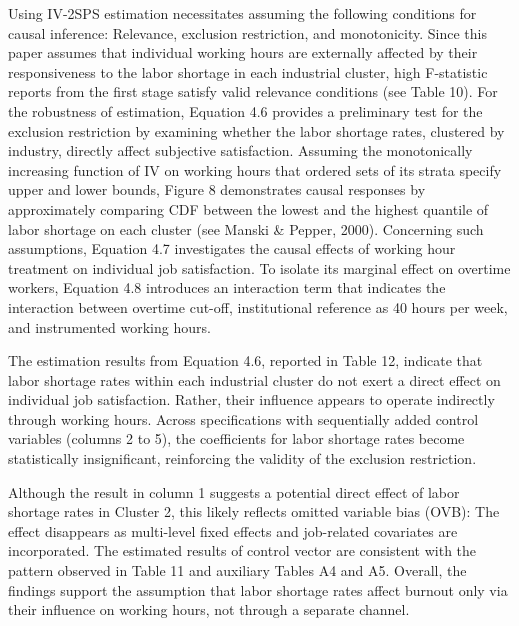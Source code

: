 \documentclass[
  12pt,
]{article}
\begin{document}
Using IV-2SPS estimation necessitates assuming the following conditions
for causal inference: Relevance, exclusion restriction, and
monotonicity. Since this paper assumes that individual working hours are
externally affected by their responsiveness to the labor shortage in
each industrial cluster, high F-statistic reports from the first stage
satisfy valid relevance conditions (see Table 10). For the robustness of
estimation, Equation 4.6 provides a preliminary test for the exclusion
restriction by examining whether the labor shortage rates, clustered by
industry, directly affect subjective satisfaction. Assuming the
monotonically increasing function of IV on working hours that ordered
sets of its strata specify upper and lower bounds, Figure 8 demonstrates
causal responses by approximately comparing CDF between the lowest and
the highest quantile of labor shortage on each cluster (see Manski \&
Pepper, 2000). Concerning such assumptions, Equation 4.7 investigates
the causal effects of working hour treatment on individual job
satisfaction. To isolate its marginal effect on overtime workers,
Equation 4.8 introduces an interaction term that indicates the
interaction between overtime cut-off, institutional reference as 40
hours per week, and instrumented working hours.

The estimation results from Equation 4.6, reported in Table 12, indicate
that labor shortage rates within each industrial cluster do not exert a
direct effect on individual job satisfaction. Rather, their influence
appears to operate indirectly through working hours. Across
specifications with sequentially added control variables (columns 2 to
5), the coefficients for labor shortage rates become statistically
insignificant, reinforcing the validity of the exclusion restriction.

Although the result in column 1 suggests a potential direct effect of
labor shortage rates in Cluster 2, this likely reflects omitted variable
bias (OVB): The effect disappears as multi-level fixed effects and
job-related covariates are incorporated. The estimated results of
control vector are consistent with the pattern observed in Table 11 and
auxiliary Tables A4 and A5. Overall, the findings support the assumption
that labor shortage rates affect burnout only via their influence on
working hours, not through a separate channel.
\end{document}
